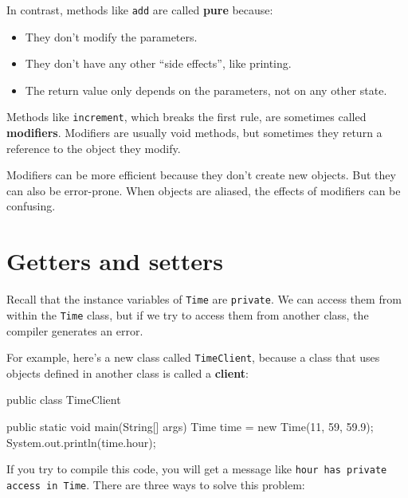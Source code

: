 \documentclass[12pt]{book}
\theoremstyle{exercise}
\newcommand{\java}[1]{\verb"#1"}
\begin{document}
In contrast, methods like \java{add} are called {\bf pure} because:

\begin{itemize}
\item They don't modify the parameters.
\item They don't have any other ``side effects'', like printing.
\item The return value only depends on the parameters, not on any other state.
\end{itemize}

Methods like \java{increment}, which breaks the first rule, are sometimes called {\bf modifiers}.
Modifiers are usually void methods, but sometimes they return a reference to the object they modify.


Modifiers can be more efficient because they don't create new objects.
But they can also be error-prone.
When objects are aliased, the effects of modifiers can be confusing.


\section{Getters and setters}


Recall that the instance variables of \java{Time} are \java{private}.
We can access them from within the \java{Time} class, but if we try to access them from another class, the compiler generates an error.


For example, here's a new class called \java{TimeClient}, because a class that uses objects defined in another class is called a {\bf client}:


\begin{code}
public class TimeClient {

    public static void main(String[] args) {
        Time time = new Time(11, 59, 59.9);
        System.out.println(time.hour);
    }
}
\end{code}

If you try to compile this code, you will get a message like {\tt hour has private access in Time}.
There are three ways to solve this problem:
\end{document}
